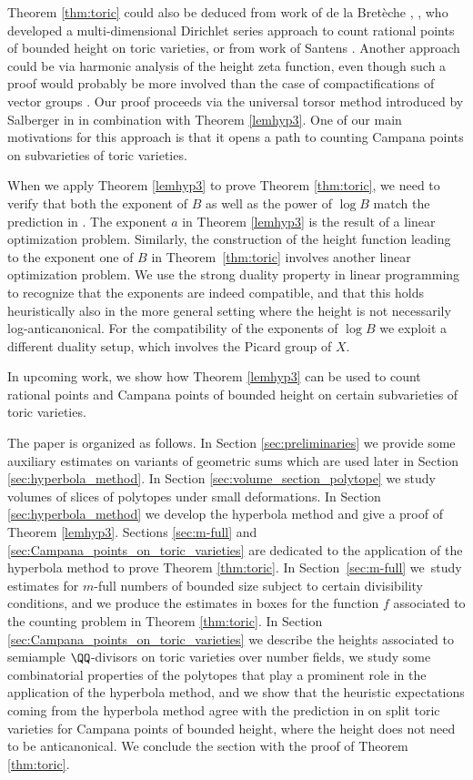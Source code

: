 Theorem \ref{thm:toric} could also be deduced from work of de la Bretèche \cite{Bre01a}, \cite{Bre01b}, who developed a multi-dimensional Dirichlet series approach to count rational points of bounded height on toric varieties, or from work of Santens \cite{Santens}. Another approach could be via harmonic analysis of the height zeta function, even though such a proof would probably be more involved than the case of compactifications of vector groups \cite{PSTVA}.
Our proof proceeds via the universal torsor method introduced by Salberger in \cite{MR1679841} in combination with Theorem \ref{lemhyp3}.
One of our main motivations for this approach is that it opens a path to counting Campana points on subvarieties of toric varieties.\par
When we apply Theorem \ref{lemhyp3} to prove Theorem \ref{thm:toric}, we need to verify that both the exponent of $B$ as well as the power of $\log B$ match the prediction in \cite{PSTVA}. The exponent $a$ in Theorem \ref{lemhyp3} is the result of a linear optimization problem. Similarly, the construction of the height function leading to the exponent one of $B$ in Theorem~\ref{thm:toric} involves another linear optimization problem. We use the strong duality property in linear programming \cite[Ch.\,6]{Dantzig} to recognize that the exponents
are indeed compatible, and that this holds heuristically also in the more general setting where the height is not necessarily log-anticanonical. For the compatibility of the exponents of $\log B$ we exploit a different duality setup, which involves the Picard group of $X$.

In upcoming work, we show how Theorem \ref{lemhyp3} can be used to count rational points and Campana points of bounded height on certain subvarieties of toric varieties.

The paper is organized as follows.
In Section \ref{sec:preliminaries} we provide some auxiliary estimates on variants of geometric sums which are used later in Section \ref{sec:hyperbola_method}.
In Section \ref{sec:volume_section_polytope} we study volumes of slices of polytopes under small deformations.
In Section \ref{sec:hyperbola_method} we develop the hyperbola method and give a proof of Theorem \ref{lemhyp3}.
Sections \ref{sec:m-full} and \ref{sec:Campana_points_on_toric_varieties} are dedicated to the application of the hyperbola method to prove Theorem \ref{thm:toric}.
In Section~\ref{sec:m-full} we~study estimates for $m$-full numbers of bounded size subject to certain divisibility conditions, and we produce the estimates in boxes for the function $f$ associated to the counting problem in Theorem \ref{thm:toric}.
In Section \ref{sec:Campana_points_on_toric_varieties} we describe the heights associated to semiample $\QQ$-divisors on toric varieties over number fields, we study some combinatorial properties of the polytopes that play a prominent role in the application of the hyperbola method, and we show that the heuristic expectations coming from the hyperbola method agree with the prediction in \cite[Conj.\,1.1]{PSTVA} on split toric varieties for Campana points of bounded height, where the height does not need to be anticanonical. We conclude the section with the proof of Theorem \ref{thm:toric}.\par

